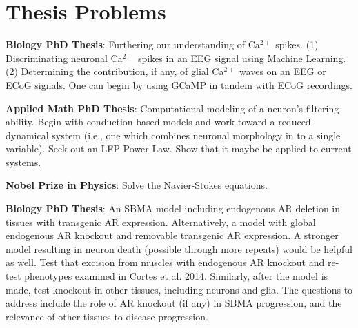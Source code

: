 \section{Thesis Problems}

\textbf{Biology PhD Thesis}: Furthering our understanding of Ca$^{2+}$ spikes. (1) Discriminating neuronal Ca$^{2+}$ spikes in an EEG signal using Machine Learning. (2) Determining the contribution, if any, of glial Ca$^{2+}$ waves on an EEG or ECoG signals. One can begin by using GCaMP in tandem with ECoG recordings. 

\textbf{Applied Math PhD Thesis}: Computational modeling of a neuron's filtering ability. Begin with conduction-based models and work toward a reduced dynamical system (i.e., one which combines neuronal morphology in to a single variable). Seek out an LFP Power Law. Show that it maybe be applied to current systems. 

\textbf{Nobel Prize in Physics}: Solve the Navier-Stokes equations.


\textbf{Biology PhD Thesis}: An SBMA model including endogenous AR deletion in tissues with transgenic AR expression. Alternatively, a model with global endogenous AR knockout and removable transgenic AR expression. A stronger model resulting in neuron death (possible through more repeats) would be helpful as well. Test that excision from muscles with endogenous AR knockout and re-test phenotypes examined in Cortes et al. 2014. Similarly, after the model is made, test knockout in other tissues, including neurons and glia. The questions to address include the role of AR knockout (if any) in SBMA progression, and the relevance of other tissues to disease progression.

\endinput